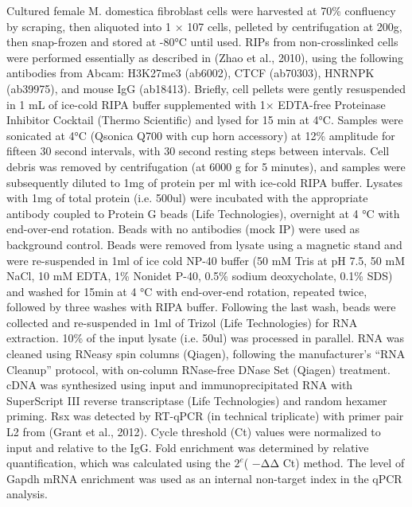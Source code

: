 Cultured female M. domestica fibroblast cells were harvested at 70\% confluency by scraping, then aliquoted into 1 × 107 cells, pelleted by centrifugation at 200g, then snap-frozen and stored at -80°C until used. RIPs from non-crosslinked cells were performed essentially as described in (Zhao et al., 2010), using the following antibodies from Abcam: H3K27me3 (ab6002), CTCF (ab70303), HNRNPK (ab39975), and mouse IgG (ab18413). Briefly, cell pellets were gently resuspended in 1 mL of ice-cold RIPA buffer supplemented with 1× EDTA-free Proteinase Inhibitor Cocktail (Thermo Scientific) and lysed for 15 min at 4°C. Samples were sonicated at 4°C (Qsonica Q700 with cup horn accessory) at 12\% amplitude for fifteen 30 second intervals, with 30 second resting steps between intervals. Cell debris was removed by centrifugation (at 6000 g for 5 minutes), and samples were subsequently diluted to 1mg of protein per ml with ice-cold RIPA buffer. Lysates with 1mg of total protein (i.e. 500ul) were incubated with the appropriate antibody coupled to Protein G beads (Life Technologies), overnight at 4 °C with end-over-end rotation. Beads with no antibodies (mock IP) were used as background control. Beads were removed from lysate using a magnetic stand and were re-suspended in 1ml of ice cold NP-40 buffer (50 mM Tris at pH 7.5, 50 mM NaCl, 10 mM EDTA, 1\% Nonidet P-40, 0.5\% sodium deoxycholate, 0.1\% SDS) and washed for 15min at 4 °C with end-over-end rotation, repeated twice, followed by three washes with RIPA buffer. Following the last wash, beads were collected and re-suspended in 1ml of Trizol (Life Technologies) for RNA extraction. 10\% of the input lysate (i.e. 50ul) was processed in parallel. RNA was cleaned using RNeasy spin columns (Qiagen), following the manufacturer's “RNA Cleanup” protocol, with on-column RNase-free DNase Set (Qiagen) treatment. cDNA was synthesized using input and immunoprecipitated RNA with SuperScript III reverse transcriptase (Life Technologies) and random hexamer priming. Rsx was detected by RT-qPCR (in technical triplicate) with primer pair L2 from (Grant et al., 2012). Cycle threshold (Ct) values were normalized to input and relative to the IgG. Fold enrichment was determined by relative quantification, which was calculated using the $2^e$( −ΔΔ Ct) method. The level of Gapdh mRNA enrichment was used as an internal non-target index in the qPCR analysis.

\begin{singlespace}
\printbibliography[heading=bibintoc,title={References}]
\end{singlespace}